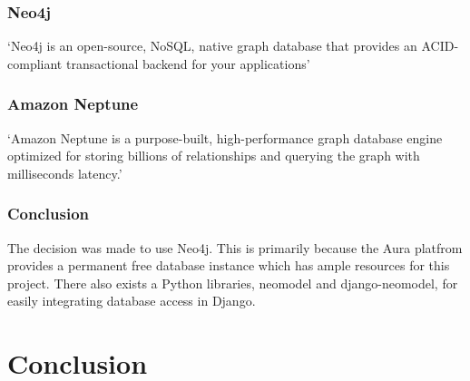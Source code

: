 \subsubsection*{Neo4j}
`Neo4j is an open-source, NoSQL, native graph database that provides an ACID-compliant transactional backend for your 
applications'\cite{WhatGraphDatabaseb}
\subsubsection*{Amazon Neptune}
`Amazon Neptune is a purpose-built, high-performance graph database engine optimized for storing billions of 
relationships and querying the graph with milliseconds latency.'\cite{WhatGraphDatabase}
\subsubsection*{Conclusion}
The decision was made to use Neo4j. This is primarily because the Aura platfrom provides a permanent free database 
instance which has ample resources for this project. There also exists a Python libraries, neomodel and django-neomodel,
 for easily integrating database access in Django.

\section{Conclusion}
